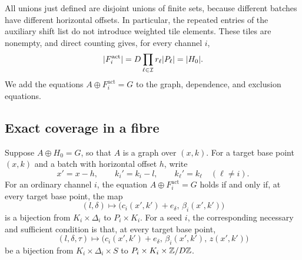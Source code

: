 All unions just defined are disjoint unions of finite sets, because
different batches have different horizontal offsets.  In particular,
the repeated entries of the auxiliary shift list do not introduce
weighted tile elements.  These tiles are nonempty, and direct counting
gives, for every channel $i$,
\[
 \lvert F_i^{\mathrm{act}}\rvert
   =D\prod_{\ell\in\mathcal I}r_\ell\lvert P_\ell\rvert
   =\lvert H_0\rvert.
\]
We add the equations $A\oplus F_i^{\mathrm{act}}=G$ to the graph,
dependence, and exclusion equations.

\subsection{Exact coverage in a fibre}

\begin{lemma}
\label{act:fibre-criterion}
Suppose $A\oplus H_0=G$, so that $A$ is a graph over $(x,k)$.
For a target base point $(x,k)$ and a batch with horizontal offset $h$,
write
\begin{equation}
\label{act:source-base}
 x'=x-h,\qquad k_i'=k_i-l,\qquad k_\ell'=k_\ell\quad(\ell\ne i).
\end{equation}
For an ordinary channel $i$, the equation
$A\oplus F_i^{\mathrm{act}}=G$ holds if and only if, at every target
base point, the map
\begin{equation}
\label{act:ordinary-map}
 (l,\delta)\longmapsto
 \bigl(c_i(x',k')+e_\delta,\,\beta_i(x',k')\bigr)
\end{equation}
is a bijection from $K_i\times\Delta_i$ to $P_i\times K_i$.
For a seed $i$, the corresponding necessary and sufficient condition is
that, at every target base point,
\begin{equation}
\label{act:seed-map}
 (l,\delta,\tau)\longmapsto
 \bigl(c_i(x',k')+e_\delta,\,\beta_i(x',k'),\,z(x',k')\bigr)
\end{equation}
be a bijection from $K_i\times\Delta_i\times S$ to
$P_i\times K_i\times\mathbb Z/D\mathbb Z$.
\end{lemma}

